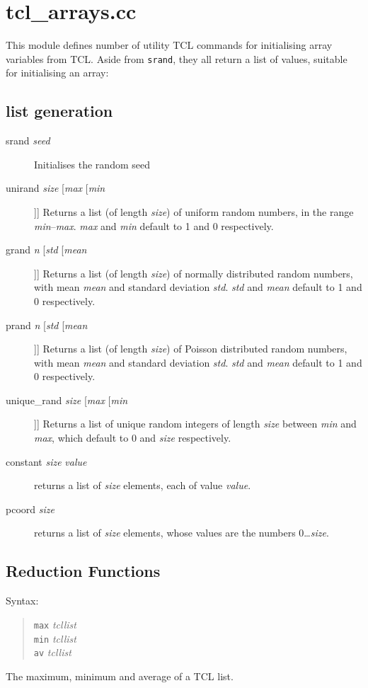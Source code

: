 \section{tcl\_arrays.cc}

This module defines number of utility TCL commands for initialising
array variables from TCL. Aside from {\tt srand}, they
all return a list of values, suitable for initialising an array:

\subsection{list generation}

\begin{description}
\item[srand {\em seed}] Initialises the random seed
\item[unirand {\em size} [{\em max} [{\em min}]]]  Returns
  a list (of length {\em size}) of uniform random numbers, in the range {\em
  min}--{\em max}. {\em max} and {\em min} default to 1 and 0
  respectively.
\item[grand {\em n} [{\em std} [{\em mean}]]]  Returns
  a list (of length {\em size}) of normally distributed random
  numbers, with mean {\em mean} and standard deviation {\em std}. {\em
  std} and {\em mean} default to 1 and 0 respectively.
\item[prand {\em n} [{\em std} [{\em mean}]]]  Returns
  a list (of length {\em size}) of Poisson distributed random
  numbers, with mean {\em mean} and standard deviation {\em std}. {\em
  std} and {\em mean} default to 1 and 0 respectively.
\item[unique\_rand {\em size} [{\em max} [{\em min}]]]
   Returns a list of unique random integers of
  length {\em size} between {\em min} and {\em max}, which default to
  0 and {\em size} respectively.
\item[constant {\em size} {\em value}]  returns a list
  of {\em size} elements, each of value {\em value}.
\item[pcoord {\em size}]  returns a list of {\em size}
  elements, whose values are the numbers 0\ldots{\em size}.
\end{description}

\subsection{Reduction Functions}

Syntax:
\begin{quote}
{\tt max} {\em tcllist}\\
{\tt min} {\em tcllist}\\
{\tt av} {\em tcllist}\\
\end{quote}

The maximum, minimum and average of a TCL list.

